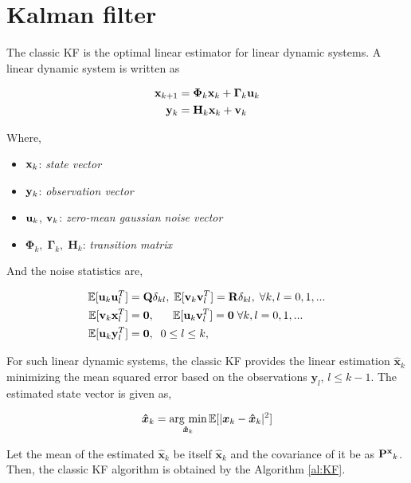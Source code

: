 \section{Kalman filter\label{sec: kf}}

The classic KF is the optimal linear estimator for linear dynamic systems. A linear dynamic system is written as

\begin{align}
{\bf x}_{k+1} &= \bm{\Phi}_k{\bf x}_{k} + \bm{\Gamma}_k{\bf u}_{k} \label{eq:linear1}\\
{\bf y}_{k} &= {\bf H}_k{\bf x}_{k} + {\bf v}_{k} \label{eq:linear2}
\end{align}

Where, 
\begin{itemize}
    \item ${\bf x}_k$: {\it state vector}
    \item ${\bf y}_k$: {\it observation vector}
    \item ${\bf u}_k$, ${\bf v}_k$: {\it zero-mean gaussian noise vector}
    \item $\bm{\Phi}_k, \; \bm{\Gamma}_k, \; \bm{H}_k$: {\it transition matrix}
\end{itemize}

And the noise statistics are,

\begin{align}
    \mathbb{E}[{\bf u}_k{\bf u}_l^T]&={\bf Q}\delta_{kl},\;
    \mathbb{E}[{\bf v}_k{\bf v}_l^T]={\bf R}\delta_{kl},\; \forall k,l=0,1,...\\
    \mathbb{E}[{\bf v}_k{\bf x}_l^T]&={\bf 0},\;\;\;\;\;\;
    \mathbb{E}[{\bf u}_k{\bf v}_l^T]={\bf 0}\; \forall k,l=0,1,...\\
    \mathbb{E}[{\bf u}_k{\bf y}_l^T]&={\bf 0}, \;\; 0\leq l\leq k,
\end{align}

For such linear dynamic systems, the classic KF provides the linear estimation $\bm{\hat x}_k$ minimizing the mean squared error based on the observations $\bm{y}_l$, $l\leq k-1$. The estimated state vector is given as,

\begin{equation} \label{eq:cost}
    \bm{\hat x}_k = \mathop{\rm arg~min}\limits_{\bm{\hat x}_k}\mathbb{E}[|\bm{x}_k-\bm{\hat x}_k|^2]
\end{equation}

Let the mean of the estimated $\bm{\hat x}_k$ be itself $\bm{\hat x}_k$ and the covariance of it be as ${\bf P^x}_{k}$. Then, the classic KF algorithm is obtained by the Algorithm \ref{al:KF}.

